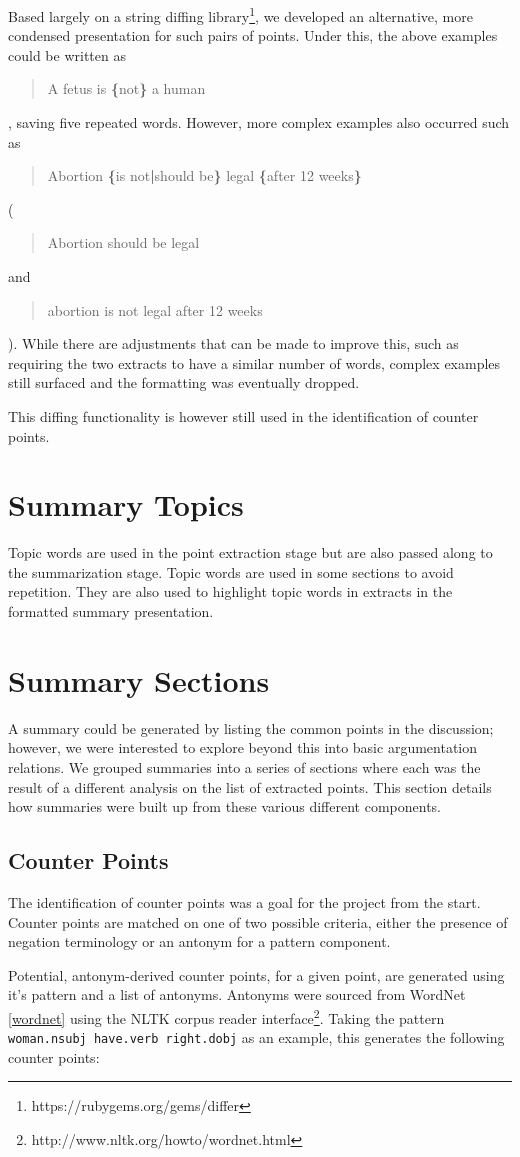      Based largely on a string diffing library\footnote{https://rubygems.org/gems/differ}, we developed an alternative, more condensed presentation for such pairs of points. Under this, the above examples could be written as \blockquote{A fetus is \textbf{\{}not\textbf{\}} a human}, saving five repeated words. However, more complex examples also occurred such as \blockquote{Abortion \textbf{\{}is not\textbf{|}should be\textbf{\}} legal \textbf{\{}after 12 weeks\textbf{\}}} (\blockquote{Abortion should be legal} and \blockquote{abortion is not legal after 12 weeks}). While there are adjustments that can be made to improve this, such as requiring the two extracts to have a similar number of words, complex examples still surfaced and the formatting was eventually dropped.

      This diffing functionality is however still used in the identification of counter points.

  \section{Summary Topics}
    Topic words are used in the point extraction stage but are also passed along to the summarization stage. Topic words are used in some sections to avoid repetition. They are also used to highlight topic words in extracts in the formatted summary presentation.

  \section{Summary Sections}
    A summary could be generated by listing the common points in the discussion; however, we were interested to explore beyond this into basic argumentation relations. We grouped summaries into a series of sections where each was the result of a different analysis on the list of extracted points. This section details how summaries were built up from these various different components.

    \subsection{Counter Points}

      The identification of counter points was a goal for the project from the start. Counter points are matched on one of two possible criteria, either the presence of negation terminology or an antonym for a pattern component.

      Potential, antonym-derived counter points, for a given point, are generated using it's pattern and a list of antonyms. Antonyms were sourced from WordNet \ref{wordnet} using the NLTK corpus reader interface\footnote{http://www.nltk.org/howto/wordnet.html}. Taking the pattern \texttt{woman.nsubj have.verb right.dobj} as an example, this generates the following counter points:

